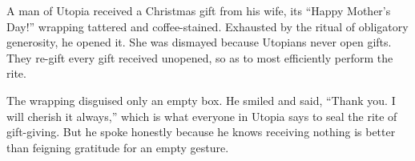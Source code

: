 
A man of Utopia received a Christmas gift from his wife, its ``Happy
Mother's Day!'' wrapping tattered and coffee-stained. Exhausted by the
ritual of obligatory generosity, he opened it. She was dismayed because
Utopians never open gifts. They re-gift every gift received unopened, so
as to most efficiently perform the rite.

The wrapping disguised only an empty box. He smiled and said, ``Thank
you. I will cherish it always,'' which is what everyone in Utopia says
to seal the rite of gift-giving. But he spoke honestly because he knows
receiving nothing is better than feigning gratitude for an empty
gesture.
